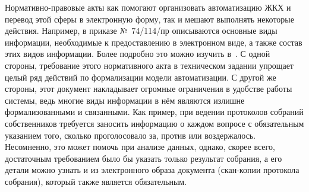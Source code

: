 Нормативно-правовые акты как помогают организовать автоматизацию ЖКХ и перевод этой сферы в электронную форму, так и мешают выполнять некоторые действия.
Например, в приказе №~74/114/пр описываются основные виды информации, необходимые к предоставлению в электронном виде, а также состав этих видов информации.
Более подробно это можно изучить в~\cite{pr74114}.
С одной стороны, требование этого нормативного акта в техническом задании упрощает целый ряд действий по формализации модели автоматизации.
С другой же стороны, этот документ накладывает огромные ограничения в удобстве работы системы, ведь многие виды информации в нём являются излишне формализованными и связанными.
Как пример, при ведении протоколов собраний собственников требуется заносить информацию о каждом вопросе с обязательным указанием того, сколько проголосовало за, против или воздержалось.
Несомненно, это может помочь при анализе данных, однако, скорее всего, достаточным требованием было бы указать только результат собрания, а его детали можно узнать и из электронного образа документа (скан-копии протокола собрания), который также является обязательным.

\clearpage
\newpage
